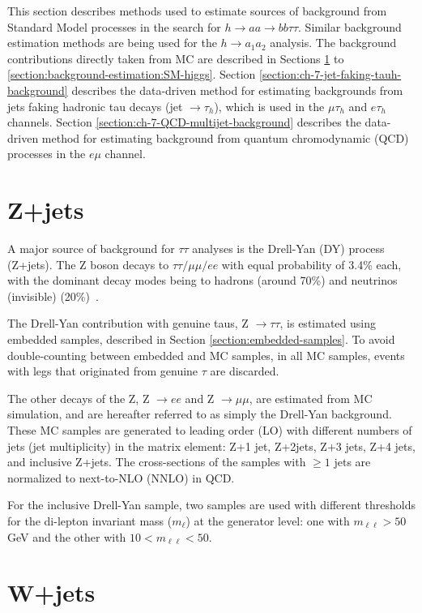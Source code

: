 This section describes methods used to estimate sources of background from Standard Model processes in the search for $h \rightarrow aa \rightarrow bb\tau\tau$. Similar background estimation methods are being used for the $h \rightarrow a_1 a_2$ analysis. The background contributions directly taken from MC are described in Sections \ref{section:background-estimation:z-plus-jets} to \ref{section:background-estimation:SM-higgs}. Section \ref{section:ch-7-jet-faking-tauh-background} describes the data-driven method for estimating backgrounds from jets faking hadronic tau decays (jet $\rightarrow \tau_{h}$), which is used in the $\mu\tau_{h}$ and $e\tau_{h}$ channels. Section \ref{section:ch-7-QCD-multijet-background} describes the data-driven method for estimating background from quantum chromodynamic (QCD) processes in the $e\mu$ channel.

\section{Z+jets}
\label{section:background-estimation:z-plus-jets}
A major source of background for $\tau\tau$ analyses is the Drell-Yan (DY) process (Z+jets). The Z boson decays to $\tau\tau/ \mu\mu/ ee$ with equal probability of 3.4\% each, with the dominant decay modes being to hadrons (around 70\%) and neutrinos (invisible) (20\%)~\cite{workman_review_2022}. 

The Drell-Yan contribution with genuine taus, Z $\rightarrow \tau\tau$, is estimated using embedded samples, described in Section \ref{section:embedded-samples}. To avoid double-counting between embedded and MC samples, in all MC samples, events with legs that originated from genuine $\tau$ are discarded.

The other decays of the Z, Z $\rightarrow ee$ and Z $\rightarrow \mu\mu$, are estimated from MC simulation, and are hereafter referred to as simply the Drell-Yan background. These MC samples are generated to leading order (LO) with different numbers of jets (jet multiplicity) in the matrix element: Z+1 jet, Z+2jets, Z+3 jets, Z+4 jets, and inclusive Z+jets. The cross-sections of the samples with $\geq 1$ jets are normalized to next-to-NLO (NNLO) in QCD.

For the inclusive Drell-Yan sample, two samples are used with different thresholds for the di-lepton invariant mass ($m_{\ell}$) at the generator level: one with $m_{\ell\ell} > 50$ GeV and the other with $10 < m_{\ell\ell} < 50$. 

\section{W+jets}

